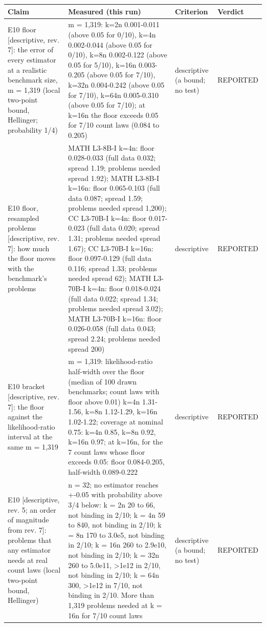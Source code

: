 \begin{table}[t]
\centering
\small
\begin{tabular}{p{1.6in}p{2.0in}p{0.95in}p{0.75in}}
\toprule
Claim & Measured (this run) & Criterion & Verdict \\
\midrule
E10 floor [descriptive, rev. 7]: the error of every estimator at a realistic benchmark size, m = 1,319 (local two-point bound, Hellinger; probability 1/4) & m = 1,319: k=2n 0.001-0.011 (above 0.05 for 0/10), k=4n 0.002-0.044 (above 0.05 for 0/10), k=8n 0.002-0.122 (above 0.05 for 5/10), k=16n 0.003-0.205 (above 0.05 for 7/10), k=32n 0.004-0.242 (above 0.05 for 7/10), k=64n 0.005-0.310 (above 0.05 for 7/10); at k=16n the floor exceeds 0.05 for 7/10 count laws (0.084 to 0.205) & descriptive (a bound; no test) & REPORTED \\
E10 floor, resampled problems [descriptive, rev. 7]: how much the floor moves with the benchmark's problems & MATH L3-8B-I k=4n: floor 0.028-0.033 (full data 0.032; spread 1.19; problems needed spread 1.92); MATH L3-8B-I k=16n: floor 0.065-0.103 (full data 0.087; spread 1.59; problems needed spread 1,200); CC L3-70B-I k=4n: floor 0.017-0.023 (full data 0.020; spread 1.31; problems needed spread 1.67); CC L3-70B-I k=16n: floor 0.097-0.129 (full data 0.116; spread 1.33; problems needed spread 62); MATH L3-70B-I k=4n: floor 0.018-0.024 (full data 0.022; spread 1.34; problems needed spread 3.02); MATH L3-70B-I k=16n: floor 0.026-0.058 (full data 0.043; spread 2.24; problems needed spread 200) & descriptive & REPORTED \\
E10 bracket [descriptive, rev. 7]: the floor against the likelihood-ratio interval at the same m = 1,319 & m = 1,319: likelihood-ratio half-width over the floor (median of 100 drawn benchmarks; count laws with floor above 0.01) k=4n 1.31-1.56, k=8n 1.12-1.29, k=16n 1.02-1.22; coverage at nominal 0.75: k=4n 0.85, k=8n 0.92, k=16n 0.97; at k=16n, for the 7 count laws whose floor exceeds 0.05: floor 0.084-0.205, half-width 0.089-0.222 & descriptive & REPORTED \\
E10 [descriptive, rev. 5; an order of magnitude from rev. 7]: problems that any estimator needs at real count laws (local two-point bound, Hellinger) & n = 32; no estimator reaches +-0.05 with probability above 3/4 below: k = 2n 20 to 66, not binding in 2/10; k = 4n 59 to 840, not binding in 2/10; k = 8n 170 to 3.0e5, not binding in 2/10; k = 16n 260 to 2.9e10, not binding in 2/10; k = 32n 260 to 5.0e11, >1e12 in 2/10, not binding in 2/10; k = 64n 300, >1e12 in 7/10, not binding in 2/10. More than 1,319 problems needed at k = 16n for 7/10 count laws & descriptive (a bound; no test) & REPORTED \\

\end{tabular}
\end{table}
